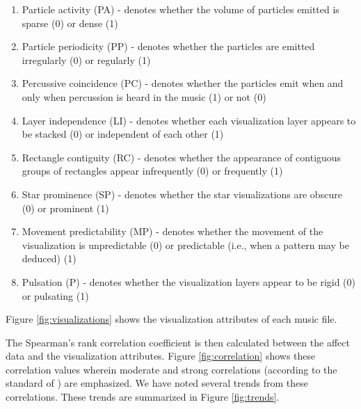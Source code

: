\documentclass{sigchi-ext}
\begin{document}
\begin{enumerate}
    \item Particle activity (PA) - denotes whether the volume of particles emitted is sparse (0) or dense (1)
    \item Particle periodicity (PP) - denotes whether the particles are emitted irregularly (0) or regularly (1)
    \item Percussive coincidence (PC) - denotes whether the particles emit when and only when percussion is heard in the music (1) or not (0)
    \item Layer independence (LI) - denotes whether each visualization layer appears to be stacked (0) or independent of each other (1)
    \item Rectangle contiguity (RC) - denotes whether the appearance of contiguous groups of rectangles appear infrequently (0) or frequently (1)
    \item Star prominence (SP) - denotes whether the star visualizations are obscure (0) or prominent (1)
    \item Movement predictability (MP) - denotes whether the movement of the visualization is unpredictable (0) or predictable (i.e., when a pattern may be deduced) (1)
    \item Pulsation (P) - denotes whether the visualization layers appear to be rigid (0) or pulsating (1)
\end{enumerate}
Figure \ref{fig:visualizations} shows the visualization attributes of each music file.

The Spearman's rank correlation coefficient is then calculated between the affect data and the visualization attributes. Figure \ref{fig:correlation} shows these correlation values wherein moderate and strong correlations (according to the standard of \cite{Cohen:1988}) are emphasized. We have noted several trends from these correlations. These trends are summarized in Figure \ref{fig:trends}.

\end{document}
